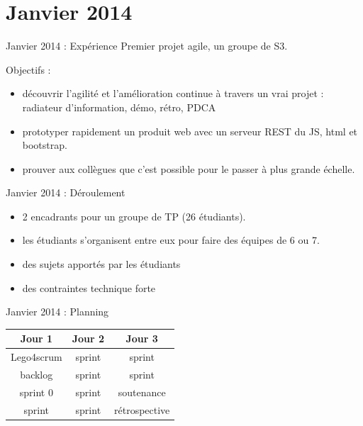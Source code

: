 \documentclass{beamer}
\begin{document}
\section{Janvier 2014}
\begin{frame}{Janvier 2014 : Expérience}
  Premier projet agile, un groupe de S3.

  Objectifs : 
  \begin{itemize}
    \item découvrir l'agilité et l'amélioration continue à travers un vrai projet : radiateur d'information, démo, rétro, PDCA
    \item prototyper rapidement un produit web avec un serveur REST du JS, html et bootstrap.
    \item prouver aux collègues que c'est possible pour le passer à plus grande échelle. 
  \end{itemize}
\end{frame}

\begin{frame}{Janvier 2014 : Déroulement}
  \begin{itemize}
    \item 2 encadrants pour un groupe de TP (26 étudiants).
    \item les étudiants s'organisent entre eux pour faire des équipes de 6 ou 7.
    \item des sujets apportés par les étudiants
    \item des contraintes technique forte
  \end{itemize}
\end{frame}

\begin{frame}{Janvier 2014 : Planning}
  \begin{center}
    \begin{tabular}{| c | c | c |}
      \hline
      \textbf{Jour 1} & \textbf{Jour 2} & \textbf{Jour 3} \\
      \hline \hline
      Lego4scrum & sprint & sprint \\
      \hline
      backlog & sprint & sprint \\
      \hline \hline
      sprint 0 & sprint & soutenance \\
      \hline
      sprint & sprint & rétrospective \\
      \hline
    \end{tabular}
  \end{center}
\end{frame}
\end{document}
